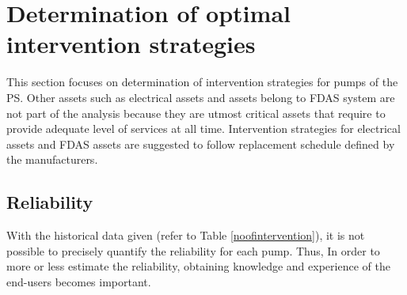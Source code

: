 
\section{Determination of optimal intervention strategies}

This section focuses on determination of intervention strategies for pumps of the PS. Other assets such as electrical assets and assets belong to FDAS system are not part of the analysis because they are utmost critical assets that require to provide adequate level of services at all time. Intervention strategies for electrical assets and FDAS assets are suggested to follow replacement schedule defined by the manufacturers. 
%
\subsection{Reliability}
With the historical data given (refer to Table \ref{noofintervention}), it is not possible to precisely quantify the reliability for each pump. Thus, In order to more or less estimate the reliability, obtaining knowledge and experience of the end-users becomes important.

